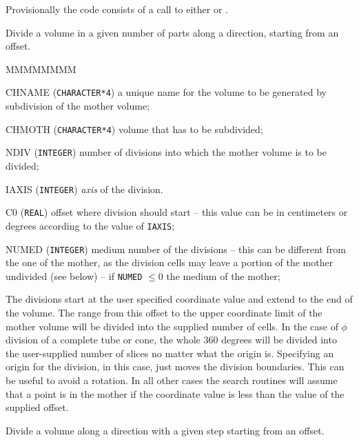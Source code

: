 Provisionally the code consists of a call to either  or
.


Divide a volume in a given number of parts along a direction, 
starting from an offset.

\begin{DLtt}{MMMMMMMM}
\item[CHNAME] ({\tt CHARACTER*4}) a unique name for the volume to be generated
by subdivision of the mother volume;
\item[CHMOTH] ({\tt CHARACTER*4}) volume that has to be subdivided;
\item[NDIV] ({\tt INTEGER}) number of divisions into which the mother volume
is to be divided;
\item[IAXIS] ({\tt INTEGER}) {\it axis} of the division.
\item[C0] ({\tt REAL}) offset where division should start -- this value can be 
in centimeters or degrees according to the value of {\tt IAXIS};
\item[NUMED] ({\tt INTEGER}) medium number of the divisions -- this can be
different from the one of the mother, as the division cells may leave a
portion of the mother undivided (see below) --
if {\tt NUMED} $\leq 0$  the medium of the mother;
\end{DLtt}

The divisions start at the user specified coordinate value
and extend to the end of the volume. The range from this offset to
the upper coordinate limit of the mother volume will be divided
into the supplied number of cells. 
In the case of 
$\phi$ division of a complete tube or cone, the whole 360 degrees
will be divided into the user-supplied number of slices no matter
what the origin is. Specifying an origin for the division, in this
case, just moves the
division boundaries. This can be useful to avoid a rotation.
In all other cases the search routines will
assume that a point is in the mother if the coordinate value is
less than the value of the supplied offset.


Divide a volume along a direction with a given step starting from an offset.

